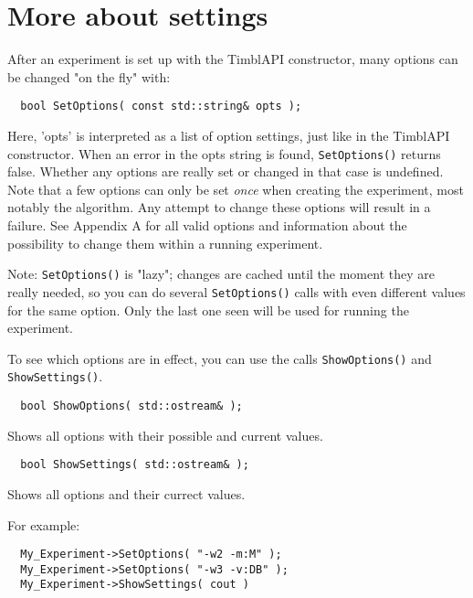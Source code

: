 \documentclass{report}
\begin{document}
\section{More about settings}

After an experiment is set up with the TimblAPI constructor, many
options can be changed "on the fly" with:

\begin{footnotesize}
\begin{verbatim}
  bool SetOptions( const std::string& opts );
\end{verbatim}
\end{footnotesize}

Here, 'opts' is interpreted as a list of option settings, just like in
the TimblAPI constructor. When an error in the opts string is found,
{\tt SetOptions()} returns false. Whether any options are really set
or changed in that case is undefined. Note that a few options can only
be set {\em once}\/ when creating the experiment, most notably the
algorithm. Any attempt to change these options will result in a
failure.  See Appendix A for all valid options and information about
the possibility to change them within a running experiment.

Note: {\tt SetOptions()} is "lazy"; changes are cached until the
moment they are really needed, so you can do several {\tt SetOptions()}
calls with even different values for the same option. Only the last
one seen will be used for running the experiment.

To see which options are in effect, you can use the calls {\tt ShowOptions()}
and {\tt ShowSettings()}.

\begin{footnotesize}
\begin{verbatim}
  bool ShowOptions( std::ostream& );
\end{verbatim}
\end{footnotesize}

Shows all options with their possible and current values.

\begin{footnotesize}
\begin{verbatim}
  bool ShowSettings( std::ostream& );
\end{verbatim}
\end{footnotesize}

Shows all options and their currect values.

For example:

\begin{footnotesize}
\begin{verbatim}
  My_Experiment->SetOptions( "-w2 -m:M" );
  My_Experiment->SetOptions( "-w3 -v:DB" );
  My_Experiment->ShowSettings( cout )
\end{verbatim}
\end{footnotesize}
\end{document}
